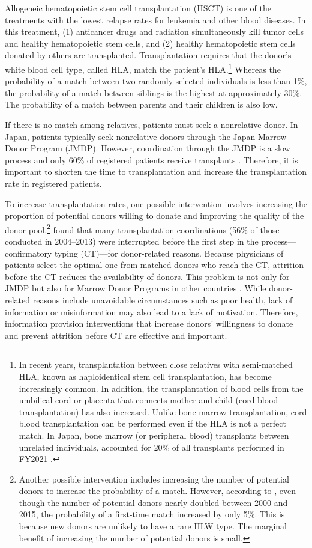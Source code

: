 \documentclass[12pt, a4paper]{article}
\begin{document}
Allogeneic hematopoietic stem cell transplantation (HSCT) is one of the treatments with the lowest relapse rates for leukemia and other blood diseases. In this treatment, (1) anticancer drugs and radiation simultaneously kill tumor cells and healthy hematopoietic stem cells, and (2) healthy hematopoietic stem cells donated by others are transplanted. Transplantation requires that the donor's white blood cell type, called HLA, match the patient's HLA.\footnote{In recent years, transplantation between close relatives with semi-matched HLA, known as haploidentical stem cell transplantation, has become increasingly common. In addition, the transplantation of blood cells from the umbilical cord or placenta that connects mother and child (cord blood transplantation) has also increased. Unlike bone marrow transplantation, cord blood transplantation can be performed even if the HLA is not a perfect match. In Japan, bone marrow (or peripheral blood) transplants between unrelated individuals, accounted for 20\% of all transplants performed in FY2021 \citep{JapaneseDataCenterf2022}.} Whereas the probability of a match between two randomly selected individuals is less than 1\%, the probability of a match between siblings is the highest at approximately 30\%. The probability of a match between parents and their children is also low.

If there is no match among relatives, patients must seek a nonrelative donor. In Japan, patients typically seek nonrelative donors through the Japan Marrow Donor Program (JMDP). However, coordination through the JMDP is a slow process and only 60\% of registered patients receive transplants \citep{Hirakawa2018}. Therefore, it is important to shorten the time to transplantation and increase the transplantation rate in registered patients.

To increase transplantation rates, one possible intervention involves increasing the proportion of potential donors willing to donate and improving the quality of the donor pool.\footnote{Another possible intervention includes increasing the number of potential donors to increase the probability of a match. However, according to \citet{Takanashi2016}, even though the number of potential donors nearly doubled between 2000 and 2015, the probability of a first-time match increased by only 5\%. This is because new donors are unlikely to have a rare HLW type. The marginal benefit of increasing the number of potential donors is small.} \citet{Hirakawa2018} found that many transplantation coordinations (56\% of those conducted in 2004--2013) were interrupted before the first step in the process---confirmatory typing (CT)---for donor-related reasons. Because physicians of patients select the optimal one from matched donors who reach the CT, attrition before the CT reduces the availability of donors. This problem is not only for JMDP but also for Marrow Donor Programs in other countries \citep{Haylock2024}. While donor-related reasons include unavoidable circumstances such as poor health, lack of information or misinformation may also lead to a lack of motivation. Therefore, information provision interventions that increase donors' willingness to donate and prevent attrition before CT are effective and important.
\end{document}
